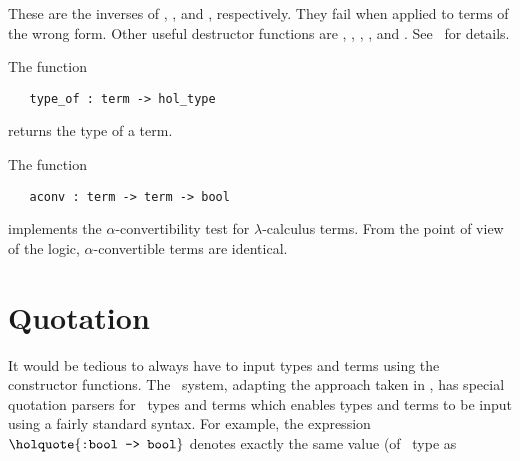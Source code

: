 These are the inverses of , ,
 and , respectively. They fail when applied
to terms of the wrong form. Other useful destructor functions are
,
,
,
,
 and
.
See \REFERENCE\ for details.

The function

\begin{boxed}
\begin{verbatim}
   type_of : term -> hol_type
\end{verbatim}\end{boxed}

\noindent returns the type
of a term. 

The function

\begin{boxed}
\begin{verbatim}
   aconv : term -> term -> bool
\end{verbatim}\end{boxed}

\noindent implements the $\alpha$-convertibility test for
$\lambda$-calculus terms.
From the point of view of the \HOL{} logic, $\alpha$-convertible terms
are identical.


\section{Quotation}
\label{quotation}\label{gen-abs}\label{let}

It would be tedious to always have to input types and terms
using the constructor functions. The \HOL\ system, adapting the
approach taken in \LCF{}, has special
quotation
parsers for \HOL\ types and terms which enables types and terms
to be input using a fairly standard syntax. For example, the \ML{}
expression $\holquote{\ml{:bool -> bool}}$ denotes exactly the same
value (of \ML\ type  as 

